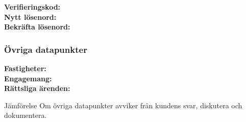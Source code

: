 \documentclass[10pt]{beamer}
\begin{document}
\begin{frame}[label=riskindikator]
\begin{flushright}
\begin{frame}[label=resetpassword]
  \textbf{Verifieringskod:} \underline{\hspace{6.5cm}} \\
  \textbf{Nytt lösenord:} \underline{\hspace{6.5cm}} \\
  \textbf{Bekräfta lösenord:} \underline{\hspace{6.5cm}} \\
  
  \vspace{0.8cm}
\end{frame}
  \end{flushright}
\end{frame}

\begin{frame}[label=ovrigt]
  \frametitle{Övriga datapunkter}
  \small
  \textbf{Fastigheter:} \underline{\hspace{8cm}} \\
  \textbf{Engagemang:} \underline{\hspace{8cm}} \\
  \textbf{Rättsliga ärenden:} \underline{\hspace{8cm}} \\
  \vspace{0.5cm}
  \begin{block}{Jämförelse}
    Om övriga datapunkter avviker från kundens svar, diskutera och dokumentera.
  \end{block}
  \vspace{0.8cm}
  \begin{flushright}
    \hyperlink{nextslide}{}
  \end{flushright}
\end{frame}
\end{document}
